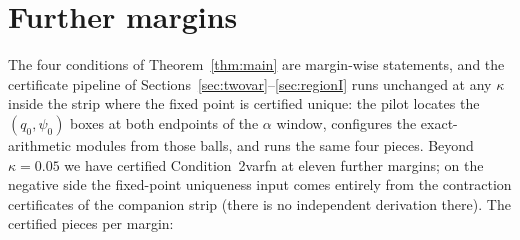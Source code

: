 
\section{Further margins}
\label{sec:margins}

The four conditions of Theorem~\ref{thm:main} are margin-wise
statements, and the certificate pipeline of
Sections~\ref{sec:twovar}--\ref{sec:regionI} runs unchanged at any
$\kappa$ inside the strip where the fixed point is certified unique:
the pilot locates the $(q_0,\psi_0)$ boxes at both endpoints of the
$\alpha$ window, configures the exact-arithmetic modules from those
balls, and runs the same four pieces.  Beyond $\kappa=0.05$ we have
certified Condition~2varfn at eleven further margins; on the negative
side the fixed-point uniqueness input comes entirely from the
contraction certificates of the companion strip (there is no
independent derivation there).  The certified pieces per margin:

